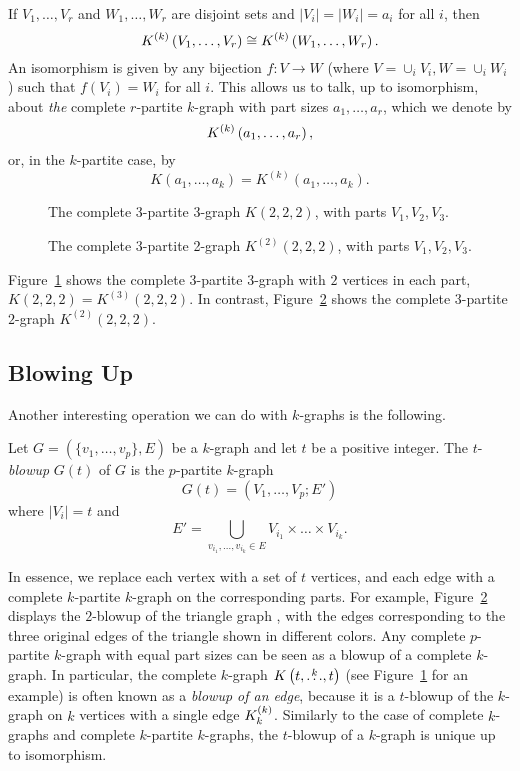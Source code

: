 If $V_1, \dots, V_r$ and $W_1, \dots, W_r$ are disjoint sets
and $|V_i| = |W_i| = a_i$ for all $i$, then
\[
    K^{(k)}\left(V_1, \dots, V_r\right) \cong K^{(k)}\left(W_1, \dots, W_r\right).
\]
An isomorphism is given by any bijection $f: V \to W$ (where $V=\cup_i V_i, W=\cup_i W_i$)
such that $f(V_i) = W_i$ for all $i$.
This allows us to talk, up to isomorphism, about \emph{the} complete $r$-partite $k$-graph
with part sizes $a_1, \dots, a_r$, which we denote by
\[
    K^{(k)}\left(a_1, \dots, a_r\right),
\]
or, in the $k$-partite case, by
\[
    K(a_1, \dots, a_k) = K^{(k)}(a_1, \dots, a_k).
\]

\begin{figure}[htbp]
    \centering
    
    \caption{The complete 3-partite 3-graph $K(2, 2, 2)$, with parts $V_1, V_2, V_3$.}
    \label{fig:222}
\end{figure}

\begin{figure}[htbp]
    \centering
    
    \caption{The complete 3-partite 2-graph $K^{(2)}(2, 2, 2)$, with parts $V_1, V_2, V_3$.}
    \label{fig:k2_222}
\end{figure}

Figure~\ref{fig:222} shows the complete $3$-partite $3$-graph
with $2$ vertices in each part, $K(2, 2, 2) = K^{(3)}(2, 2, 2)$.
In contrast, Figure~\ref{fig:k2_222} shows the complete $3$-partite $2$-graph
$K^{(2)}(2, 2, 2)$.

\subsection{Blowing Up} \label{subsec:blowup}
Another interesting operation we can do with $k$-graphs is the following.

\begin{definition}
    Let $G = (\{v_1, \dots, v_p\}, E)$ be a $k$-graph and let $t$ be a positive integer.
    The $t$-\emph{blowup} $G(t)$ of $G$ is the $p$-partite $k$-graph
    \[
        G(t) = (V_1, \dots, V_p; E')
    \]
    where $|V_i| = t$ and
    \[
        E' = \bigcup_{v_{i_1}, \dots, v_{i_k} \in E} V_{i_1} \times \dots \times V_{i_k}.
    \]
\end{definition}

In essence, we replace each vertex with a set of $t$ vertices, and each edge with a complete $k$-partite $k$-graph
on the corresponding parts.
For example, Figure~\ref{fig:k2_222} displays the $2$-blowup of the triangle graph ,
with the edges corresponding to the three original edges of the triangle shown in different colors.
Any complete $p$-partite $k$-graph with equal part sizes can be seen as a blowup of a complete $k$-graph.
In particular, the complete $k$-graph $K\left(t, \overset{k}{\dots}, t\right)$ (see Figure~\ref{fig:222} for an example)
is often known as a \emph{blowup of an edge}, because it is a $t$-blowup of the
$k$-graph on $k$ vertices with a single edge $K^{(k)}_{k}$.
Similarly to the case of complete $k$-graphs and complete $k$-partite $k$-graphs,
the $t$-blowup of a $k$-graph is unique up to isomorphism.

